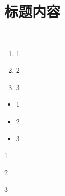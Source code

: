 
\section{标题内容}


\begin{equation}
	
\end{equation}

\begin{equation}\begin{aligned}
	
\end{aligned}\end{equation}

\begin{enumerate}
	\item 1
	\item 2
	\item 3
\end{enumerate}

\begin{itemize}
	\item 1
	\item 2
	\item 3
\end{itemize}

\begin{description}
	\item 1
	\item 2
	\item 3
\end{description}

{\color{red}{ }}

\approx